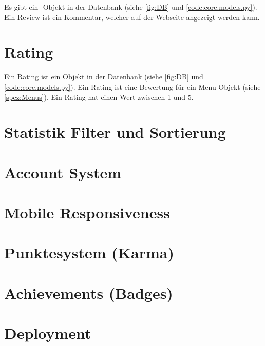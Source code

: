 Es gibt ein -Objekt in der Datenbank (siehe \ref{fig:DB} und
\ref{code:core.models.py}). Ein Review ist ein Kommentar, welcher auf der
Webseite angezeigt werden kann.

\section{Rating} \label{spez:Rating}

Ein Rating ist ein Objekt in der Datenbank (siehe \ref{fig:DB} und
\ref{code:core.models.py}). Ein Rating ist eine Bewertung für ein Menu-Objekt
(siehe \ref{spez:Menus}). Ein Rating hat einen Wert zwischen 1 und 5.

\section{Statistik Filter und Sortierung} \label{spez:Statistik}
\section{Account System} \label{spez:Account}
\section{Mobile Responsiveness} \label{spez:Mobile}
\section{Punktesystem (Karma)} \label{spez:Karma}
\section{Achievements (Badges)} \label{spez:Badges}
\section{Deployment} \label{spez:Deployment}

